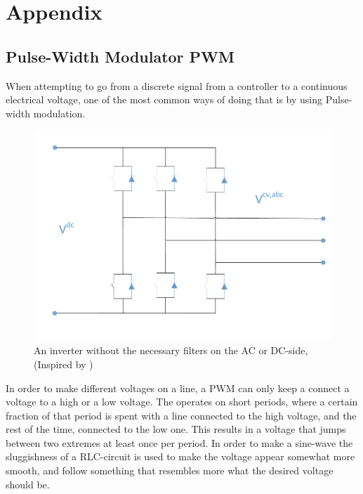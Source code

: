 
\chapter{ Appendix }
\label{chp:appendix}
\section{Pulse-Width Modulator PWM}
\label{sec:PWM}

When attempting to go from a discrete signal from a controller to a continuous electrical voltage, one of the most common ways of doing that is by using Pulse-width modulation. 
\begin{figure}
    \centering
    \includegraphics[width=\textwidth,height=\textheight,keepaspectratio]{Figures/Inverter.pdf}
    \caption{An inverter without the necessary filters on the AC or DC-side, (Inspired by \cite{Suul_electro_presentation_1})}
    \label{fig:PWM}
\end{figure}{}
In order to make different voltages on a line, a \gls{PWM} can only keep a connect a voltage to a high or a low voltage. The operates on short periods, where a certain fraction of that period is spent with a line connected to the high voltage, and the rest of the time, connected to the low one. This results in a voltage that jumps between two extremes at least once per period. In order to make a sine-wave the sluggishness of a RLC-circuit is used to make the voltage appear somewhat more smooth, and follow something that resembles more what the desired voltage should be. 

